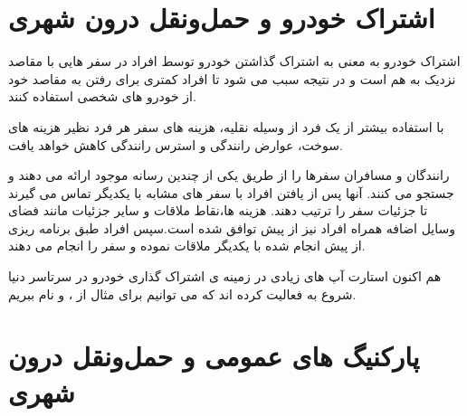 \section{اشتراک خودرو و حمل‌و‌نقل درون شهری}
اشتراک خودرو به معنی به اشتراک گذاشتن خودرو توسط افراد در سفر هایی با مقاصد نزدیک به هم است و در نتیجه سبب می شود تا افراد کمتری برای رفتن به مقاصد خود از خودرو های شخصی استفاده کنند.

با استفاده بیشتر از یک فرد از وسیله نقلیه، هزینه های سفر هر فرد نظیر  هزینه های سوخت، عوارض رانندگی و استرس رانندگی کاهش خواهد یافت.

رانندگان و مسافران سفرها را از طریق یکی از چندین رسانه موجود ارائه می دهند و جستجو می کنند. آنها پس از یافتن افراد با سفر های مشابه با یکدیگر تماس می گیرند تا جزئیات سفر را ترتیب دهند. هزینه ها،‌نقاط ملاقات و سایر جزئیات مانند فضای وسایل اضافه همراه افراد نیز از پیش توافق شده است.‌‌سپس افراد طبق برنامه ریزی از پیش انجام شده با یکدیگر ملاقات نموده و سفر را انجام می دهند.

هم اکنون استارت آپ های زیادی در زمینه ی اشتراک گذاری خودرو در سرتاسر دنیا شروع به فعالیت کرده اند که می توانیم برای مثال از  ،  و  نام ببریم.

\section{پارکنیگ های عمومی و حمل‌و‌نقل درون شهری}






















